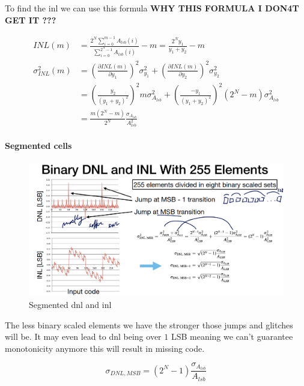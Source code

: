 \documentclass[
  a4paper,
]{article}
\begin{document}
To find the {inl} we can use this formula \textbf{WHY THIS FORMULA I
DON4T GET IT ???}

\[\begin{aligned}
    INL(m) &= \frac{2^N \sum_{i=0}^{m-1} A_{lsb}(i) }{\sum_{i=0}^{2^N - 1} A_{lsb}(i) } - m = \frac{2^N y_1}{y_1 + y_2}  - m\\
    \sigma_{INL}^2(m) &= \left(\frac{\partial INL(m)}{\partial y_1} \right)^2 \sigma_{y_1}^2 + \left(\frac{\partial INL(m)}{\partial y_2} \right)^2 \sigma_{y_2}^2\\
    &= \left( \frac{y_2}{(y_1+y_2)^2} \right)^2 m \sigma_{A_{lsb}}^2 + \left( \frac{-y_1}{(y_1+y_2)^2} \right)^2 (2^N-m) \sigma_{A_{lsb}}^2\\
    &= \frac{m(2^N - m)}{2^N} \frac{\sigma_{A_{lsb}}}{A_{lsb}^2}
\end{aligned}\]

\hypertarget{segmented-cells}{%
\paragraph{Segmented cells}\label{segmented-cells}}

\begin{figure}
\hypertarget{fig:segmented-cell-label}{%
\centering
\includegraphics{img/segmented_DNL_INL.png}
\caption{Segmented {dnl} and {inl}}\label{fig:segmented-cell-label}
}
\end{figure}

The less binary scaled elements we have the stronger those jumps and
glitches will be. It may even lead to {dnl} being over \(1\) LSB meaning
we can't guarantee monotonicity anymore this will result in missing
code.

\[\sigma_{DNL, MSB} = (2^N -1) \frac{\sigma_{A_{lsb}}}{A_{lsb}}\]
\end{document}
